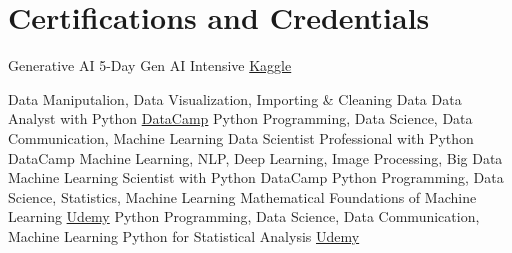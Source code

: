 \section{Certifications and Credentials}
\cventry{}%
{Generative AI}%
{5-Day Gen AI Intensive}%
{\href{https://www.kaggle.com/certification/badges/jmrb103/96}{Kaggle}}%
{}{}

\cventry{}%
{Data Maniputalion, Data Visualization, Importing \& Cleaning Data}%
{Data Analyst with Python}%
{\href{https://www.datacamp.com/statement-of-accomplishment/track/5e8ce7b0a28fe0dad0a2241cec95b0e3e0705e5d}{DataCamp}}%
{}{}
\cventry{}%
{Python Programming, Data Science, Data Communication, Machine Learning}%
{Data Scientist Professional with Python}%
{DataCamp}%
{}{}
\cventry{}%
{Machine Learning, NLP, Deep Learning, Image Processing, Big Data}%
{Machine Learning Scientist with Python}%
{DataCamp}%
{}{}
\cventry{}%
{Python Programming, Data Science, Statistics, Machine Learning}%
{Mathematical Foundations of Machine Learning}%
{\href{https://www.udemy.com/certificate/UC-605df108-ae80-4297-8c8f-6bc15b967511/}{Udemy}}%
{}{}
\cventry{}%
{Python Programming, Data Science, Data Communication, Machine Learning}%
{Python for Statistical Analysis}%
{\href{https://www.udemy.com/certificate/UC-e8557ac8-13f9-41bf-ab46-f196a041b725/}{Udemy}}%
{}{}